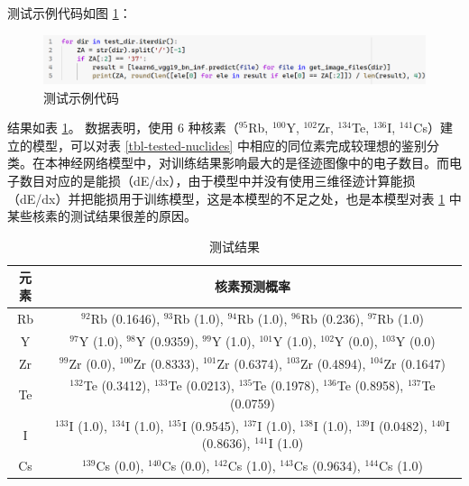 \documentclass[AutoFakeBold]{LZUThesis}
\begin{document}
测试示例代码如图 \ref{fig-test-code}：

\begin{figure}[H]
    \centering
    \includegraphics[width=1.0\textwidth]{figures/test-code.png}
    \caption{测试示例代码}
    \label{fig-test-code}
\end{figure}


结果如表 \ref{tbl-test-result}。
数据表明，使用 6 种核素（$^{95}$Rb, $^{100}$Y, $^{102}$Zr, $^{134}$Te, $^{136}$I, $^{141}$Cs）建立的模型，可以对表 \ref{tbl-tested-nuclides} 中相应的同位素完成较理想的鉴别分类。在本神经网络模型中，对训练结果影响最大的是径迹图像中的电子数目。而电子数目对应的是能损（dE/dx），由于模型中并没有使用三维径迹计算能损（dE/dx）并把能损用于训练模型，这是本模型的不足之处，也是本模型对表 \ref{tbl-test-result} 中某些核素的测试结果很差的原因。

\begin{table}[H]
    \centering
    \caption{测试结果}
    \begin{tabular}{cc} %
    \toprule
    元素 & 核素预测概率 \\
    \midrule
    Rb & $^{92}$Rb (0.1646), $^{93}$Rb (1.0), $^{94}$Rb (1.0), $^{96}$Rb (0.236), $^{97}$Rb (1.0) \\
    Y& $^{97}$Y (1.0), $^{98}$Y (0.9359), $^{99}$Y (1.0), $^{101}$Y (1.0), $^{102}$Y (0.0), $^{103}$Y (0.0) \\
    Zr& $^{99}$Zr (0.0), $^{100}$Zr (0.8333), $^{101}$Zr (0.6374), $^{103}$Zr (0.4894), $^{104}$Zr (0.1647) \\
    Te& $^{132}$Te (0.3412), $^{133}$Te (0.0213), $^{135}$Te (0.1978), $^{136}$Te (0.8958), $^{137}$Te (0.0759) \\
    I& $^{133}$I (1.0), $^{134}$I (1.0), $^{135}$I (0.9545), $^{137}$I (1.0), $^{138}$I (1.0), $^{139}$I (0.0482), $^{140}$I (0.8636), $^{141}$I (1.0) \\
    Cs&  $^{139}$Cs (0.0), $^{140}$Cs (0.0), $^{142}$Cs (1.0), $^{143}$Cs (0.9634), $^{144}$Cs (1.0)\\
    \bottomrule
    \end{tabular}
    \label{tbl-test-result}
\end{table}

\end{document}
